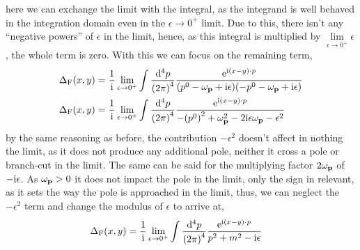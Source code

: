 here we can exchange the limit with the integral, as the integrand is well behaved in the integration domain even in the $\epsilon\rightarrow 0^+$ limit. Due to this, there isn't any ``negative powers'' of $\epsilon$ in the limit, hence, 
as this integral is multiplied by $\lim\limits_{\epsilon\rightarrow 0^+}\epsilon$, the whole term is zero. With this we can focus on the remaining term,
\begin{align}
    \Delta_{\textnormal{F}}\qty(x,y) &=\frac{1}{\textnormal{i}}\lim\limits_{\epsilon\rightarrow 0^+} \int\frac{\dd[4]{ p}}{\qty(2\pi)^4}\frac{\textnormal{e}^{\textnormal{i} \qty(x- y)\cdot p}}{\qty(p^0-\omega_{\vb p}+\textnormal{i}\epsilon)\qty(-p^0-\omega_{\vb p}+\textnormal{i}\epsilon)}\\
    \Delta_{\textnormal{F}}\qty(x,y) &=\frac{1}{\textnormal{i}}\lim\limits_{\epsilon\rightarrow 0^+} \int\frac{\dd[4]{ p}}{\qty(2\pi)^4}\frac{\textnormal{e}^{\textnormal{i} \qty(x- y)\cdot p}}{-\qty(p^0)^2+\omega_{\vb p}^2-2\textnormal{i}\epsilon\omega_{\vb p}-\epsilon^2}
\end{align}
by the same reasoning as before, the contribution $-\epsilon^2$ doesn't affect in nothing the limit, as it does not produce any additional pole, neither it cross a pole or branch-cut in the limit. The same can be said for the 
multiplying factor $2\omega_{\vb p}$ of $-\textnormal{i}\epsilon$. As $\omega_{\vb p}>0$ it does not impact the pole in the limit, only the sign in relevant, as it sets the way the pole is approached in the limit, thus, we can neglect the 
$-\epsilon^2$ term and change the modulus of $\epsilon$ to arrive at,
\begin{align}
    \Delta_{\textnormal{F}}\qty(x,y) &=\frac{1}{\textnormal{i}}\lim\limits_{\epsilon\rightarrow 0^+} \int\frac{\dd[4]{ p}}{\qty(2\pi)^4}\frac{\textnormal{e}^{\textnormal{i} \qty(x- y)\cdot p}}{p^2+m^2-\textnormal{i}\epsilon}
\end{align}